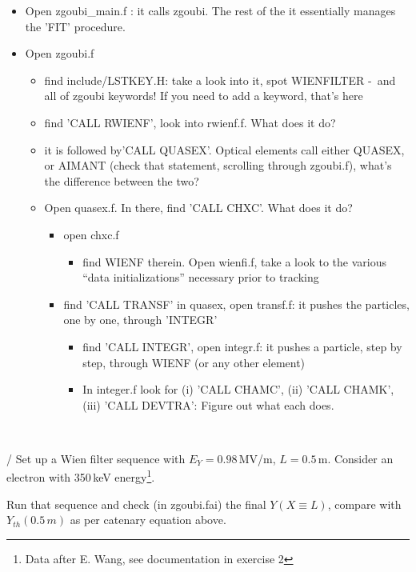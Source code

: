 \begin{itemize}
\item Open zgoubi\_main.f : it calls zgoubi. The rest of the it essentially manages the 'FIT' procedure.
\item Open zgoubi.f 
\begin{itemize}
  \item find include/LSTKEY.H: take a look into it, spot WIENFILTER -~and all of zgoubi keywords! If you need to add a keyword, that's here
  \item find 'CALL RWIENF', look into rwienf.f. What does it do?
  \item it is followed by'CALL QUASEX'. 
    Optical elements call either QUASEX, or AIMANT (check that statement, scrolling through zgoubi.f), what's the difference between the two? 
  \item  Open quasex.f.   In there, find 'CALL CHXC'. What does it do? 
  \begin{itemize}
    \item open chxc.f
    \begin{itemize}
      \item find WIENF therein. Open wienfi.f, take a look to the various ``data initializations'' necessary prior to tracking
      \end{itemize}
    \item find 'CALL TRANSF' in quasex, open transf.f: it pushes the particles, one by one, through 'INTEGR'
    \begin{itemize}
      \item find 'CALL INTEGR', open integr.f: it pushes a particle, step by step, 
        through WIENF (or any other element)
      \item In integer.f look for 
        (i) 'CALL CHAMC',
          (ii) 'CALL CHAMK', 
          (iii) 'CALL DEVTRA': 
          Figure out what each does.
    \end{itemize}
  \end{itemize}
\end{itemize}
\end{itemize}

~

/ Set up a Wien filter sequence with $ E_Y=0.98$\,MV/m,  $ L=0.5$\,m.
Consider an electron with 350\,keV energy\footnote{Data after E. Wang, see documentation in exercise 2}. 

 Run that sequence and check (in zgoubi.fai) the final $Y(X\equiv L)$,
  compare with $Y_{th}(0.5\,m)$  as per catenary equation above.

